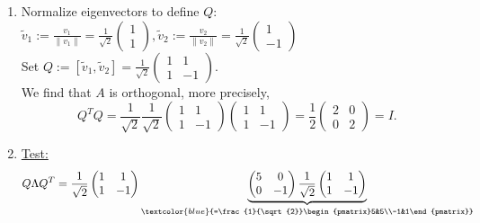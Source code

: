 {\begin{enumerate}
\begin{enumerate}
\begin{align*}
		&\Leftrightarrow 3v_1^{\textcolor{red}{2}}+3v_2^{\textcolor{red}{2}} =0\\
		&\Leftrightarrow v_1^{\textcolor{red}{2}} =- v_2^{\textcolor{red}{2}}
		\end{align*}
		Choose, e.g., $v^{\textcolor{red}{2}} = \begin{pmatrix}1\\-1\end{pmatrix}$.
	\end{enumerate}
	\item Normalize eigenvectors to define $Q$:\\
	$\tilde{v}_1:=\frac{v_1}{\| v_1\|}=\frac{1}{\sqrt{2}}\begin{pmatrix}1\\1\end{pmatrix}, \tilde{v}_2:=\frac{v_2}{\| v_2\|}=\frac{1}{\sqrt{2}}\begin{pmatrix}1\\-1\end{pmatrix}$\\
	Set $Q:=[\tilde{v}_1, \tilde{v}_2] = \frac{1}{\sqrt{2}}\begin{pmatrix}1&1\\1&-1\end{pmatrix}$.\\
	We find that $A$ is orthogonal, more precisely, $$Q^TQ =\frac{1}{\sqrt{2}}\frac{1}{\sqrt{2}}\begin{pmatrix}1&1\\1&-1\end{pmatrix}\begin{pmatrix}1&1\\1&-1\end{pmatrix}=\frac{1}{2}\begin{pmatrix}2&0\\0&2\end{pmatrix} = I.$$
	\item 
	\underline{Test:} 
	\begin{align*} 
	Q\Lambda Q^T &=\frac{1}{\sqrt{2}}\begin{pmatrix} 1&1\\1&-1\end{pmatrix}\underbrace{\begin{pmatrix}5&0\\0&-1\end{pmatrix}\frac{1}{\sqrt{2}}\begin{pmatrix}1&1\\1&-1\end{pmatrix}}_{\textcolor{blue}{=\frac{1}{\sqrt{2}}\begin{pmatrix}5&5\\-1&1\end{pmatrix}}}\\

\end{align*}
\end{enumerate}}
